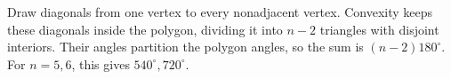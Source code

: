 Draw diagonals from one vertex to every nonadjacent vertex. Convexity keeps these diagonals inside the polygon, dividing it into $n-2$ triangles with disjoint interiors. Their angles partition the polygon angles, so the sum is $(n-2)180^\circ$. For $n=5,6$, this gives $\boxed{540^\circ,720^\circ}$.
